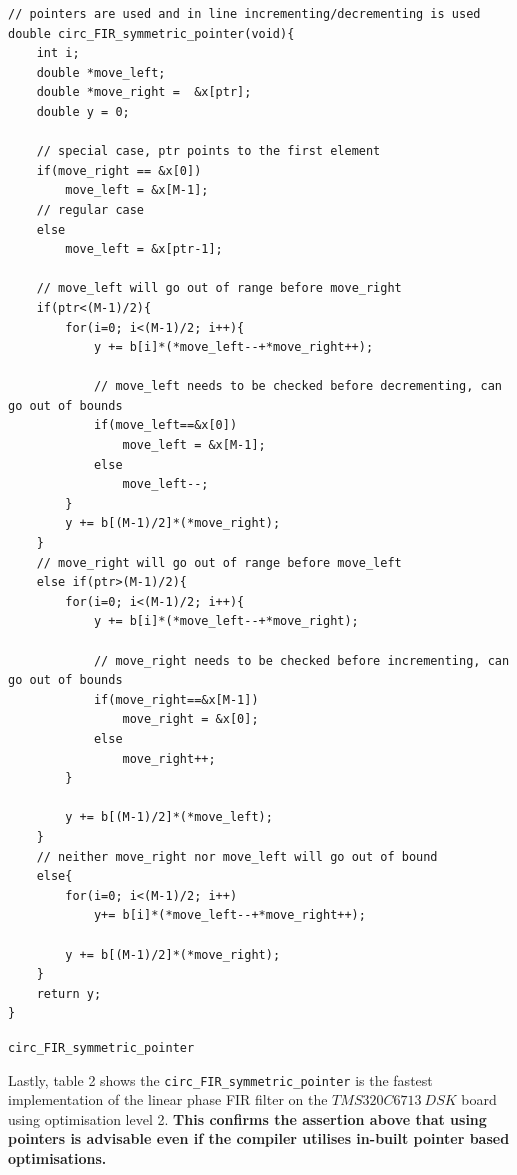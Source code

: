 \documentclass{article}
\begin{document}
\begin{listing}[H]
\begin{verbatim}
// pointers are used and in line incrementing/decrementing is used
double circ_FIR_symmetric_pointer(void){					
    int i;				
    double *move_left;			
    double *move_right =  &x[ptr];			
    double y = 0;				
    
    // special case, ptr points to the first element
    if(move_right == &x[0])				
        move_left = &x[M-1];
    // regular case
    else				
        move_left = &x[ptr-1];	
        
    // move_left will go out of range before move_right 
    if(ptr<(M-1)/2){				
        for(i=0; i<(M-1)/2; i++){			
            y += b[i]*(*move_left--+*move_right++);
            
            // move_left needs to be checked before decrementing, can go out of bounds 
            if(move_left==&x[0])		
                move_left = &x[M-1];	
            else		
                move_left--;	
        }			
        y += b[(M-1)/2]*(*move_right);			
    }
    // move_right will go out of range before move_left
    else if(ptr>(M-1)/2){				
        for(i=0; i<(M-1)/2; i++){			
            y += b[i]*(*move_left--+*move_right);
         
            // move_right needs to be checked before incrementing, can go out of bounds    
            if(move_right==&x[M-1])		
                move_right = &x[0];	
            else		
                move_right++;	
        }
        
        y += b[(M-1)/2]*(*move_left);			
    }
    // neither move_right nor move_left will go out of bound
    else{				
        for(i=0; i<(M-1)/2; i++)			
            y+= b[i]*(*move_left--+*move_right++);		
    			
        y += b[(M-1)/2]*(*move_right);			
    }				
    return y;				
}
\end{verbatim}
\caption{{\tt circ\_FIR\_symmetric\_pointer}} 
\label{lst:fastest}
\end{listing}
\newpage
Lastly, table 2 shows the {\tt circ\_FIR\_symmetric\_pointer} is the fastest implementation of the linear phase FIR filter on the $TMS320C6713 \ DSK$ board using optimisation level 2. \textbf{This confirms the assertion above that using pointers is advisable even if the compiler utilises in-built pointer based optimisations.}
\end{document}

